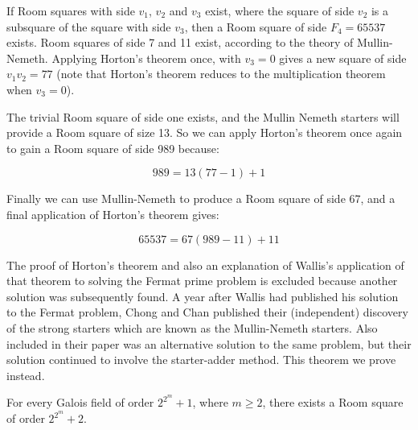 \begin{example}
If Room squares with side $v_1$, $v_2$ and $v_3$ exist, where the square of side $v_2$ is a subsquare of the square with side $v_3$, then a Room square of side $F_4 = 65537$ exists.
Room squares of side 7 and 11 exist, according to the theory of Mullin-Nemeth.
Applying Horton’s theorem once, with $v_3 = 0$ gives a new square of side $v_1v_2 = 77$ (note that Horton’s theorem reduces to the multiplication theorem when $v_3 = 0$).

The trivial Room square of side one exists, and the Mullin Nemeth starters will provide a Room square of size 13.
So we can apply Horton’s theorem once again to gain a Room square of side 989 because:

\begin{equation}
989 = 13(77 - 1) + 1
\end{equation}

Finally we can use Mullin-Nemeth to produce a Room square of side 67, and a final application of Horton’s theorem gives:

\begin{equation}
65537 = 67(989 - 11) + 11
\end{equation}

\end{example}

The proof of Horton’s theorem and also an explanation of Wallis’s application of that theorem to solving the Fermat prime problem is excluded because another solution was subsequently found.
A year after Wallis had published his solution to the Fermat problem, Chong and Chan published their (independent) discovery of the strong starters which are known as the Mullin-Nemeth starters.
Also included in their paper was an alternative solution to the same problem, but their solution continued to involve the starter-adder method.
This theorem we prove instead.

\begin{theorem}
\label{thm:chong-chan}
For every Galois field of order $2^{2^m} + 1$, where $m \geq 2$, there exists a Room square of order
$2^{2^m} + 2$.
\end{theorem}

